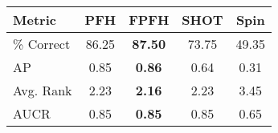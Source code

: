 \begin{tabular}{ | l || c | c | c | c | }
\hline
Metric & PFH & FPFH & SHOT & Spin \\
\hline
 \% Correct & 86.25 & \bf 87.50 & 73.75 & 49.35 \\
AP & 0.85 & \bf 0.86 & 0.64 & 0.31 \\
Avg. Rank & 2.23 & \bf 2.16 & 2.23 & 3.45 \\
AUCR & 0.85 & \bf 0.85 & 0.85 & 0.65 \\
\hline
\end{tabular}